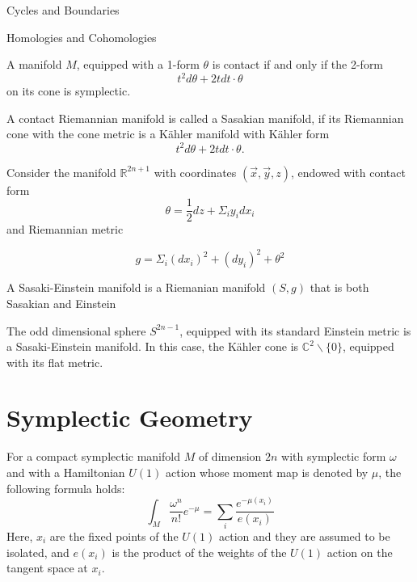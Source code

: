 \begin{subsubsection}{Cycles and Boundaries}
\begin{subsubsection}{Homologies and Cohomologies}
\begin{definition}
A manifold $M$, equipped with a 1-form $\theta$ is contact if and only if the 2-form
\begin{equation}
t^2d\theta + 2tdt\cdot\theta
\end{equation}
on its cone is symplectic.
\end{definition}

\begin{definition}
A contact Riemannian manifold is called a Sasakian manifold, if its Riemannian cone with the cone metric is a K\"ahler manifold with K\"ahler form
\begin{equation}
t^2d\theta + 2t dt\cdot \theta .
\end{equation}
\end{definition}

\begin{example}
Consider the manifold $\mathbb{R}^{2n+1}$ with coordinates $(\vec{x},\vec{y},z)$, endowed with contact form 
\begin{equation}
\theta = \frac{1}{2}dz + \Sigma_i{y_idx_i}
\end{equation}
and Riemannian metric

\begin{equation}
g = \Sigma_i{(dx_i)^2 + (dy_i)^2 + \theta^2}
\end{equation}
\end{example}

\begin{definition}
A Sasaki-Einstein manifold is a Riemanian manifold $(S,g)$ that is both Sasakian and Einstein
\end{definition}

\begin{example}
The odd dimensional sphere $S^{2n-1}$, equipped with its standard Einstein metric is a Sasaki-Einstein manifold. In this case, the K\"ahler cone is $\mathbb{C}^2\backslash\{0\}$, equipped with its flat metric.
\end{example}

\section{Symplectic Geometry}
\begin{theorem}
For a compact symplectic manifold $M$ of dimension $2n$ with symplectic form $\omega$ and with a Hamiltonian $U(1)$ action whose moment map is denoted by $\mu$, the following formula holds:
\begin{equation}
\int_M{\frac{\omega^n}{n!}e^{-\mu}} = \sum_i{\frac{e^{-\mu(x_i)}}{e(x_i)}}
\end{equation}
Here, $x_i$ are the fixed points of the $U(1)$ action and they are assumed to be isolated, and $e(x_i)$ is the product of the weights of the $U(1)$ action on the tangent space at $x_i$.


\end{theorem}
\end{subsubsection}
\end{subsubsection}
